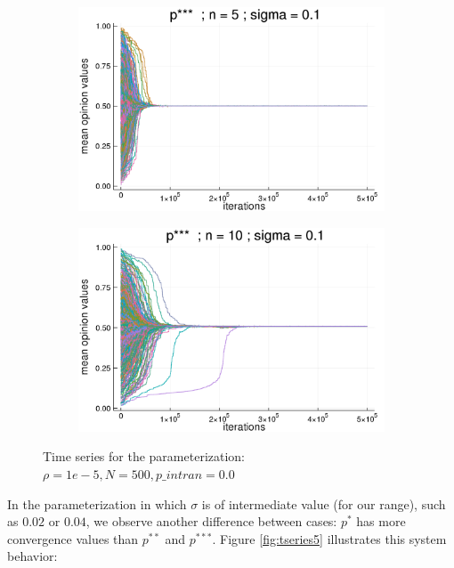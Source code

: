 \documentclass{article}
\begin{document}
\begin{figure}[H]
\begin{subfigure}[b]{0.45\textwidth}
        \includegraphics[width=\textwidth]{img/compare-ps/Poodlcalculatep***n5-rho1e-5-sigma01-00intrans.png}
      \end{subfigure}
            \begin{subfigure}[b]{0.45\textwidth}
        \includegraphics[width=\textwidth]{img/compare-ps/foofigure7.png}
      \end{subfigure}
      \caption{Time series for the parameterization: \(\rho = 1e-5, N =
        500, p\_intran = 0.0 \)}
      \label{fig:tseries4}
    \end{figure}
    In the parameterization in which \(\sigma\) is of intermediate value (for
    our range), such as \(0.02\) or \(0.04\), we observe another difference
    between cases: \(p^{*}\) has more convergence values than \(p^{**}\) and
    \(p^{***}\). Figure \ref{fig:tseries5} illustrates this system behavior:
\end{document}
